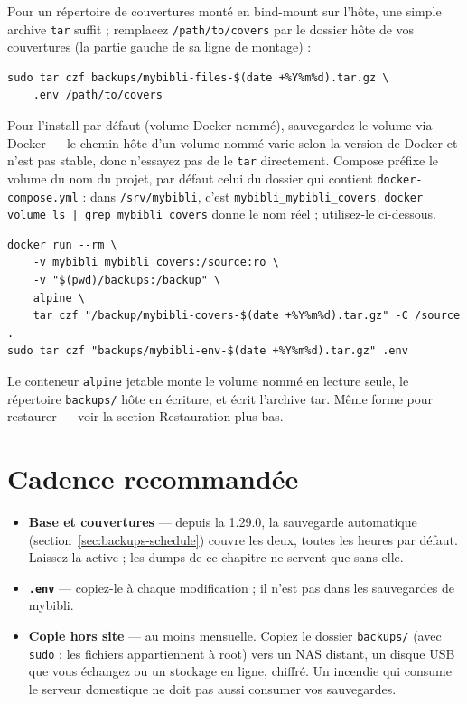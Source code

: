 Pour un répertoire de couvertures monté en bind-mount sur l'hôte,
une simple archive \texttt{tar} suffit ; remplacez
\texttt{/path/to/covers} par le dossier hôte de vos couvertures (la
partie gauche de sa ligne de montage) :

\begin{lstlisting}
sudo tar czf backups/mybibli-files-$(date +%Y%m%d).tar.gz \
    .env /path/to/covers
\end{lstlisting}

Pour l'install par défaut (volume Docker nommé), sauvegardez le
volume via Docker — le chemin hôte d'un volume nommé varie selon la
version de Docker et n'est pas stable, donc n'essayez pas de le
\texttt{tar} directement. Compose préfixe le volume du nom du projet,
par défaut celui du dossier qui contient \texttt{docker-compose.yml} :
dans \texttt{/srv/mybibli}, c'est \texttt{mybibli\_mybibli\_covers}.
\texttt{docker volume ls | grep mybibli\_covers} donne le nom réel ;
utilisez-le ci-dessous.

\begin{lstlisting}
docker run --rm \
    -v mybibli_mybibli_covers:/source:ro \
    -v "$(pwd)/backups:/backup" \
    alpine \
    tar czf "/backup/mybibli-covers-$(date +%Y%m%d).tar.gz" -C /source .
sudo tar czf "backups/mybibli-env-$(date +%Y%m%d).tar.gz" .env
\end{lstlisting}

Le conteneur \texttt{alpine} jetable monte le volume nommé en
lecture seule, le répertoire \texttt{backups/} hôte en écriture, et
écrit l'archive tar. Même forme pour restaurer — voir la section
Restauration plus bas.

\section{Cadence recommandée}

\begin{itemize}
  \item \textbf{Base et couvertures} — depuis la 1.29.0, la sauvegarde
        automatique (section~\ref{sec:backups-schedule}) couvre les
        deux, toutes les heures par défaut. Laissez-la active ; les
        dumps de ce chapitre ne servent que sans elle.
  \item \textbf{\texttt{.env}} — copiez-le à chaque modification ; il
        n'est pas dans les sauvegardes de mybibli.
  \item \textbf{Copie hors site} — au moins mensuelle. Copiez le
        dossier \texttt{backups/} (avec \texttt{sudo} : les fichiers
        appartiennent à root) vers un NAS distant, un disque USB que
        vous échangez ou un stockage en ligne, chiffré. Un incendie qui
        consume le serveur domestique ne doit pas aussi consumer vos
        sauvegardes.
\end{itemize}

